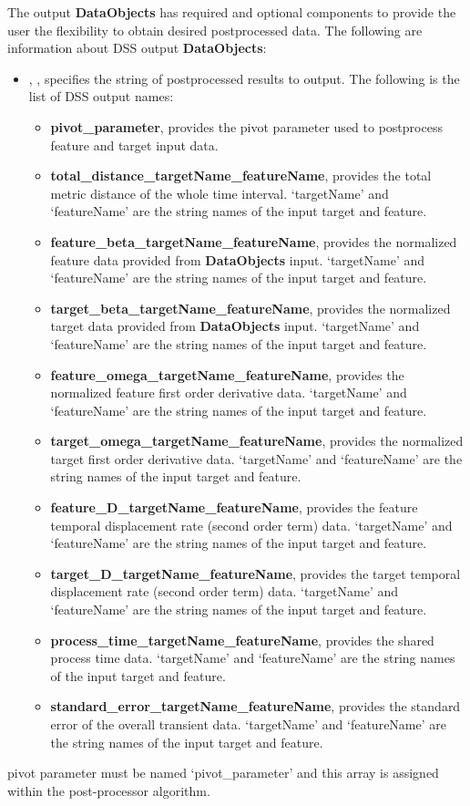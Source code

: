 The output \textbf{DataObjects} has required and optional components to provide the user the flexibility to obtain desired postprocessed data. The following are information about DSS output \textbf{DataObjects}:
\begin{itemize}
  \item {}, , specifies the string of postprocessed results to output. The following is the list of DSS output names:
    \begin{itemize}
      \item \textbf{pivot\_parameter}, provides the pivot parameter used to postprocess feature and target input data.
      \item \textbf{total\_distance\_targetName\_featureName}, provides the total metric distance of the whole time interval. `targetName' and `featureName' are the string names of the input target and feature.
      \item \textbf{feature\_beta\_targetName\_featureName}, provides the normalized feature data provided from \textbf{DataObjects} input.  `targetName' and `featureName' are the string names of the input target and feature.
      \item \textbf{target\_beta\_targetName\_featureName}, provides the normalized target data provided from \textbf{DataObjects} input.  `targetName' and `featureName' are the string names of the input target and feature.
      \item \textbf{feature\_omega\_targetName\_featureName}, provides the normalized feature first order derivative data.  `targetName' and `featureName' are the string names of the input target and feature.
      \item \textbf{target\_omega\_targetName\_featureName}, provides the normalized target first order derivative data.  `targetName' and `featureName' are the string names of the input target and feature.
      \item \textbf{feature\_D\_targetName\_featureName}, provides the feature temporal displacement rate (second order term) data.  `targetName' and `featureName' are the string names of the input target and feature.
      \item \textbf{target\_D\_targetName\_featureName}, provides the target temporal displacement rate (second order term) data.  `targetName' and `featureName' are the string names of the input target and feature.
      \item \textbf{process\_time\_targetName\_featureName}, provides the shared process time data.  `targetName' and `featureName' are the string names of the input target and feature.
      \item \textbf{standard\_error\_targetName\_featureName}, provides the standard error of the overall transient data.  `targetName' and `featureName' are the string names of the input target and feature.
    \end{itemize}
\end{itemize}
pivot parameter must be named `pivot\_parameter' and this array is assigned within the post-processor algorithm.

